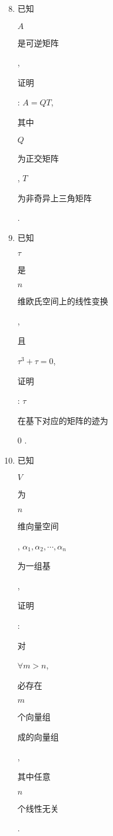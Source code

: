 \documentclass[10pt]{article}
\begin{document}
\begin{enumerate}
  \setcounter{enumi}{7}
  \item \begin{CJK}{UTF8}{mj}已知\end{CJK} $A$ \begin{CJK}{UTF8}{mj}是可逆矩阵\end{CJK}, \begin{CJK}{UTF8}{mj}证明\end{CJK}: $A=Q T$, \begin{CJK}{UTF8}{mj}其中\end{CJK} $Q$ \begin{CJK}{UTF8}{mj}为正交矩阵\end{CJK}, $T$ \begin{CJK}{UTF8}{mj}为非奇异上三角矩阵\end{CJK}.

  \item \begin{CJK}{UTF8}{mj}已知\end{CJK} $\tau$ \begin{CJK}{UTF8}{mj}是\end{CJK} $n$ \begin{CJK}{UTF8}{mj}维欧氏空间上的线性变换\end{CJK}, \begin{CJK}{UTF8}{mj}且\end{CJK} $\tau^{3}+\tau=0$, \begin{CJK}{UTF8}{mj}证明\end{CJK}: $\tau$ \begin{CJK}{UTF8}{mj}在基下对应的矩阵的迹为\end{CJK} 0 .

  \item \begin{CJK}{UTF8}{mj}已知\end{CJK} $V$ \begin{CJK}{UTF8}{mj}为\end{CJK} $n$ \begin{CJK}{UTF8}{mj}维向量空间\end{CJK}, $\alpha_{1}, \alpha_{2}, \cdots, \alpha_{n}$ \begin{CJK}{UTF8}{mj}为一组基\end{CJK}, \begin{CJK}{UTF8}{mj}证明\end{CJK}: \begin{CJK}{UTF8}{mj}对\end{CJK} $\forall m>n$, \begin{CJK}{UTF8}{mj}必存在\end{CJK} $m$ \begin{CJK}{UTF8}{mj}个向量组\end{CJK} \begin{CJK}{UTF8}{mj}成的向量组\end{CJK}, \begin{CJK}{UTF8}{mj}其中任意\end{CJK} $n$ \begin{CJK}{UTF8}{mj}个线性无关\end{CJK}.


\end{enumerate}
\end{document}
